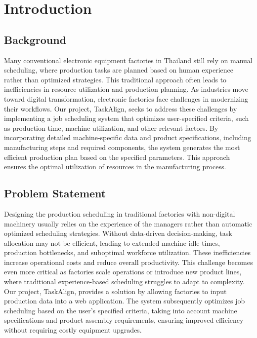 \chapter{Introduction}
\label{chap:introduction}

\section{Background}
\label{section:background}

Many conventional electronic equipment factories in Thailand still rely on manual scheduling, where production tasks are planned based on human experience rather than optimized strategies. This traditional approach often leads to inefficiencies in resource utilization and production planning. As industries move toward digital transformation, electronic factories face challenges in modernizing their workflows.
Our project, TaskAlign, seeks to address these challenges by implementing a job scheduling system that optimizes user-specified criteria, such as production time, machine utilization, and other relevant factors. By incorporating detailed machine-specific data and product specifications, including manufacturing steps and required components, the system generates the most efficient production plan based on the specified parameters. This approach ensures the optimal utilization of resources in the manufacturing process.

\section{Problem Statement}
\label{section:problem-statement}

Designing the production scheduling in traditional factories with non-digital machinery usually relies on the experience of the managers rather than automatic optimized scheduling strategies. Without data-driven decision-making, task allocation may not be efficient, leading to extended machine idle times, production bottlenecks, and suboptimal workforce utilization. These inefficiencies increase operational costs and reduce overall productivity.
This challenge becomes even more critical as factories scale operations or introduce new product lines, where traditional experience-based scheduling struggles to adapt to complexity. Our project, TaskAlign, provides a solution by allowing factories to input production data into a web application. The system subsequently optimizes job scheduling based on the user's specified criteria, taking into account machine specifications and product assembly requirements, ensuring improved efficiency without requiring costly equipment upgrades.

